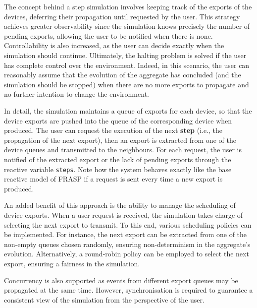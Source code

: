 The concept behind a step simulation involves keeping track of the exports of
the devices, deferring their propagation until requested by the user. This
strategy achieves greater observability since the simulation knows precisely
the number of pending exports, allowing the user to be notified when there is
none. Controllability is also increased, as the user can decide exactly when
the simulation should continue. Ultimately, the halting problem is solved if
the user has complete control over the environment. Indeed, in this scenario,
the user can reasonably assume that the evolution of the aggregate has
concluded (and the simulation should be stopped) when there are no more exports
to propagate and no further intention to change the environment.

In detail, the simulation maintains a queue of exports for each device, so that
the device exports are pushed into the queue of the corresponding device when
produced. The user can request the execution of the next \textbf{step} (i.e.,
the propagation of the next export), then an export is extracted from one of
the device queues and transmitted to the neighbours. For each request, the user
is notified of the extracted export or the lack of pending exports through the
reactive variable \texttt{steps}. Note how the system behaves exactly like the
base reactive model of FRASP if a request is sent every time a new export is
produced.

An added benefit of this approach is the ability to manage the scheduling of
device exports. When a user request is received, the simulation takes charge of
selecting the next export to transmit. To this end, various scheduling policies
can be implemented. For instance, the next export can be extracted from one of
the non-empty queues chosen randomly, ensuring non-determinism in the
aggregate's evolution. Alternatively, a round-robin policy can be employed to
select the next export, ensuring a fairness in the simulation.

Concurrency is also supported as events from different export queues may be
propagated at the same time. However, synchronisation is required to guarantee
a consistent view of the simulation from the perspective of the user.
